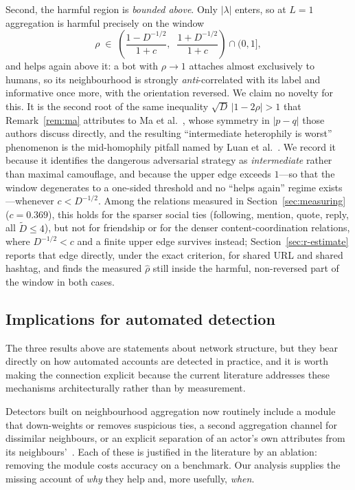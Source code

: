 \documentclass[onecolumn,pdflatex,sn-basic,Numbered]{sn-jnl}
\theoremstyle{thmstyleone}
\theoremstyle{thmstylethree}
\begin{document}
Second, the harmful region is \emph{bounded above}. Only $|\lambda|$ enters, so at
$L=1$ aggregation is harmful precisely on the window
\begin{equation}
    \rho \;\in\;
    \left(\frac{1 - D^{-1/2}}{1+c},\;\; \frac{1 + D^{-1/2}}{1+c}\right)
    \cap (0,1] ,
    \label{eq:window}
\end{equation}
and helps again above it: a bot with $\rho \to 1$ attaches almost exclusively to
humans, so its neighbourhood is strongly \emph{anti}-correlated with its label and
informative once more, with the orientation reversed. We claim no novelty for this.
It is the second root of the same inequality
$\sqrt{D}\,|1-2\rho| > 1$ that Remark~\ref{rem:ma} attributes to
Ma et al.~\citep{ma2022homophily}, whose symmetry in $|p-q|$ those authors discuss
directly, and the resulting ``intermediate heterophily is worst'' phenomenon is the
mid-homophily pitfall named by Luan et al.~\citep{luan2023when}. We record it because
it identifies the dangerous adversarial strategy as \emph{intermediate} rather than
maximal camouflage, and because the upper edge exceeds $1$---so that the window
degenerates to a one-sided threshold and no ``helps again'' regime exists---whenever
$c < D^{-1/2}$. Among the relations measured in Section~\ref{sec:measuring}
($c = 0.369$), this holds for the sparser social ties (following, mention, quote,
reply, all $\tilde D \le 4$), but not for friendship or for the denser
content-coordination relations, where $D^{-1/2} < c$ and a finite upper edge
survives instead; Section~\ref{sec:r-estimate} reports that edge directly, under
the exact criterion, for shared URL and shared hashtag, and finds the measured
$\hat\rho$ still inside the harmful, non-reversed part of the window in both
cases.

\subsection{Implications for automated detection}
\label{sec:implications}

The three results above are statements about network structure, but they bear directly
on how automated accounts are detected in practice, and it is worth making the
connection explicit because the current literature addresses these mechanisms
architecturally rather than by measurement.

Detectors built on neighbourhood aggregation now routinely include a module that
down-weights or removes suspicious ties, a second aggregation channel for
dissimilar neighbours, or an explicit separation of an actor's own attributes from its
neighbours'~\citep{dou2020caregnn,he2025bothp,dang2026xhbot}. Each of these is
justified in the literature by an ablation: removing the module costs accuracy on a
benchmark. Our analysis supplies the missing account of \emph{why} they help and,
more usefully, \emph{when}.
\end{document}
